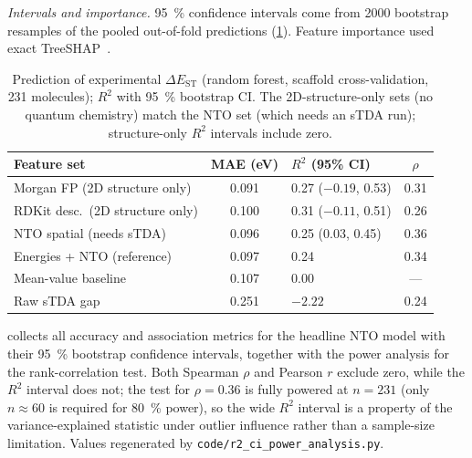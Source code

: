 \documentclass[twoside,twocolumn,9pt]{extarticle}
\begin{document}
\emph{Intervals and importance.} \qty{95}{\percent} confidence intervals come from
\num{2000} bootstrap resamples of the pooled out-of-fold predictions
(\cref{tab:model_metrics}). Feature importance used exact TreeSHAP~\cite{Lundberg2017}.

\begin{table}[htbp]
  \centering
  \caption{Prediction of experimental $\Delta E_\text{ST}$ (random forest,
    scaffold cross-validation, \num{231} molecules); $R^2$ with \qty{95}{\percent}
    bootstrap CI. The 2D-structure-only sets (no quantum chemistry) match the NTO
    set (which needs an sTDA run); structure-only $R^2$ intervals include zero.}
  \label{tab:model_metrics}
  \small
  \begin{tabular}{@{}l@{}clc@{}}
    \toprule
    Feature set & MAE (eV) & $R^2$ (95\% CI) & $\rho$ \\
    \midrule
    Morgan FP (2D structure only)   & 0.091 & 0.27 ($-0.19$, 0.53) & 0.31 \\
    RDKit desc.\ (2D structure only) & 0.100 & 0.31 ($-0.11$, 0.51) & 0.26 \\
    NTO spatial (needs sTDA)        & 0.096 & 0.25 (0.03, 0.45) & 0.36 \\
    Energies + NTO (reference)      & 0.097 & 0.24 & 0.34 \\
    Mean-value baseline             & 0.107 & 0.00 & --- \\
    Raw sTDA gap                    & 0.251 & $-2.22$ & 0.24 \\
    \bottomrule
  \end{tabular}
\end{table}

 collects all accuracy and association metrics for the
headline NTO model with their \qty{95}{\percent} bootstrap confidence intervals,
together with the power analysis for the rank-correlation test. Both Spearman
$\rho$ and Pearson $r$ exclude zero, while the $R^2$ interval does not; the
test for $\rho = 0.36$ is fully powered at $n = 231$ (only $n \approx 60$ is
required for \qty{80}{\percent} power), so the wide $R^2$ interval is a property
of the variance-explained statistic under outlier influence rather than a
sample-size limitation. Values regenerated by
\texttt{code/r2\_ci\_power\_analysis.py}.
\end{document}
